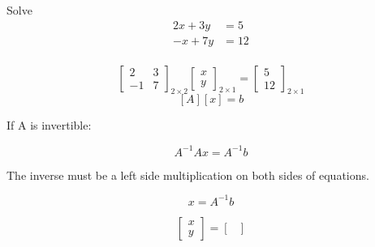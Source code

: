 \begin{example}[]
	Solve
	\begin{align*}
		2x + 3y &= 5 \\
		-x + 7y &=  12 \\
	\end{align*}

	\[\begin{bmatrix} 2 & 3 \\ -1 & 7 \end{bmatrix}_{2\times 2} \begin{bmatrix} x \\ y \end{bmatrix}_{2\times 1} = \begin{bmatrix} 5 \\ 12 \end{bmatrix}_{2\times 1}  \]
	\[ [A] [x] = b\]

	If A is invertible:

	\[A^{-1}Ax = A^{-1}b\]

	The inverse must be a left side multiplication on both sides of equations.

	\[x = A^{-1}b\]

	\[\begin{bmatrix} x \\ y  \end{bmatrix} = \begin{bmatrix} \\ \end{bmatrix} \]


\end{example}
